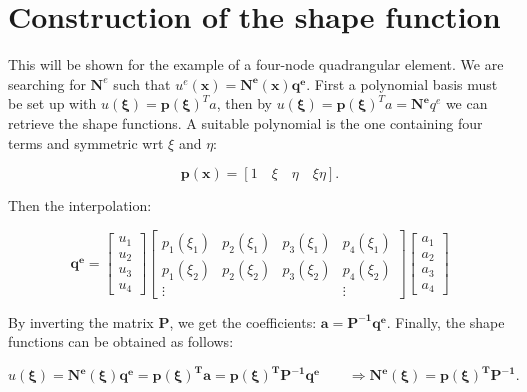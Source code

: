 \section{Construction of the shape function}
	This will be shown for the example of a four-node quadrangular element. We are searching for $\bm{N}^e$ such that $u^e(\bm{x}) = \bm{N^e(x)q^e}$. First a polynomial basis must be set up with $u(\bm{\xi}) = \bm{p(\xi)}^T a$, then by $u(\bm{\xi}) = \bm{p(\xi)}^T a = \bm{N^e}q^e$ we can retrieve the shape functions. A suitable polynomial is the one containing four terms and symmetric wrt $\xi$ and $\eta$: 
	
	\begin{equation}
	\bm{p(x)} = [1\quad \xi \quad \eta \quad \xi \eta].
	\end{equation}
	
	Then the interpolation: 
	
	\begin{equation}
	\bm{q^e} = \left[
	\begin{array}{c}
	u_1\\
	u_2\\
	u_3\\
	u_4
	\end{array}
	\right]
	\left[
	\begin{array}{cccc}
	p_1(\xi _1) & p_2(\xi _1) & p_3(\xi _1) & p_4(\xi _1)\\
	p_1(\xi _2) & p_2(\xi _2) & p_3(\xi _2) & p_4(\xi _2)\\
	\vdots & & & \vdots
	\end{array}
	\right]
	\left[
	\begin{array}{c}
	a_1\\
	a_2\\
	a_3\\
	a_4
	\end{array}
	\right]
	\end{equation}
	
	By inverting the matrix $\bm{P}$, we get the coefficients: $\bm{a = P^{-1}q^e}$. Finally, the shape functions can be obtained as follows: 
	
	\begin{equation}
	u(\bm{\xi}) = \bm{N^e(\xi)q^e = p(\xi)^Ta = p(\xi)^TP^{-1}q^e} \qquad \Rightarrow \bm{N^e(\xi) = p(\xi)^TP^{-1}}.
	\end{equation}